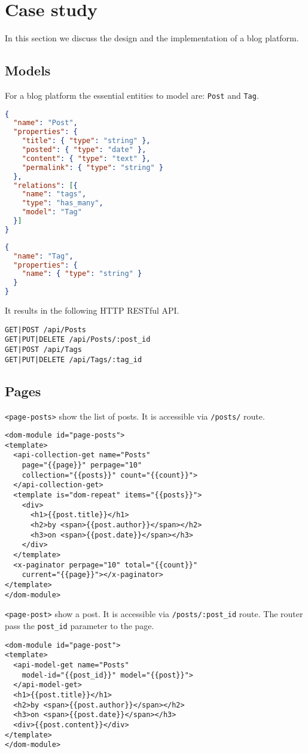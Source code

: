 \section{Case study}\label{sec:case-study}
In this section we discuss the design and the implementation of a blog platform. 

\subsection{Models}

For a blog platform the essential entities to model are: \texttt{Post} and \texttt{Tag}.

\begin{lstlisting}[language=json]
{
  "name": "Post",
  "properties": {
    "title": { "type": "string" },
    "posted": { "type": "date" },
    "content": { "type": "text" },
    "permalink": { "type": "string" }
  }, 
  "relations": [{
    "name": "tags", 
    "type": "has_many", 
    "model": "Tag"
  }]
}
\end{lstlisting}

\begin{lstlisting}[language=json]
{
  "name": "Tag",
  "properties": {
    "name": { "type": "string" }
  }
}
\end{lstlisting}

It results in the following HTTP RESTful API.

\begin{lstlisting}
GET|POST /api/Posts
GET|PUT|DELETE /api/Posts/:post_id
GET|POST /api/Tags
GET|PUT|DELETE /api/Tags/:tag_id
\end{lstlisting}

\subsection{Pages}

\texttt{<page-posts>} show the list of posts.
It is accessible via \texttt{/posts/} route.

\begin{lstlisting}[language=HTML5]
<dom-module id="page-posts">
<template>
  <api-collection-get name="Posts"
    page="{{page}}" perpage="10"
    collection="{{posts}}" count="{{count}}">
  </api-collection-get>
  <template is="dom-repeat" items="{{posts}}">
    <div>
      <h1>{{post.title}}</h1>
      <h2>by <span>{{post.author}}</span></h2>
      <h3>on <span>{{post.date}}</span></h3>
    </div>
  </template>
  <x-paginator perpage="10" total="{{count}}" 
    current="{{page}}"></x-paginator>
</template>
</dom-module>
\end{lstlisting}

\texttt{<page-post>} show a post. 
It is accessible via \texttt{/posts/:post\_id} route.
The router pass the \texttt{post\_id} parameter to the page.

\begin{lstlisting}[language=HTML5]
<dom-module id="page-post">
<template>
  <api-model-get name="Posts" 
    model-id="{{post_id}}" model="{{post}}">
  </api-model-get>
  <h1>{{post.title}}</h1>
  <h2>by <span>{{post.author}}</span></h2>
  <h3>on <span>{{post.date}}</span></h3>
  <div>{{post.content}}</div>
</template>
</dom-module>
\end{lstlisting}
